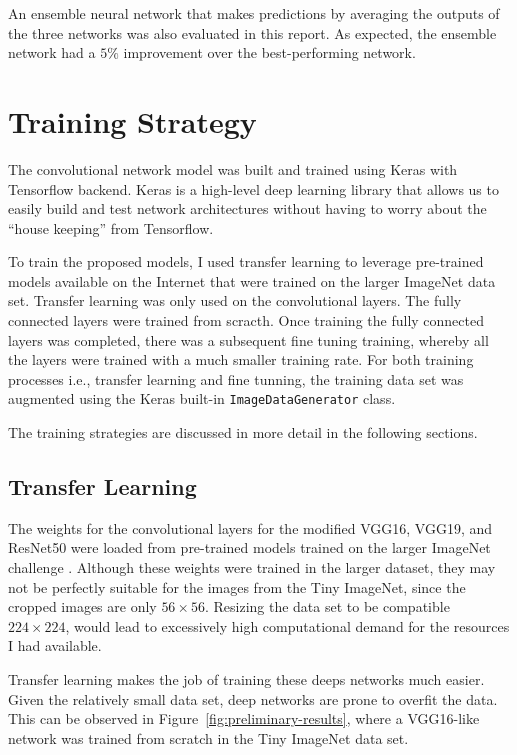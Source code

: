 \documentclass[10pt,twocolumn,letterpaper]{article}
\begin{document}
An ensemble neural network that makes predictions by averaging the outputs of the three networks was also evaluated in this report. As expected, the ensemble network had a $5\%$ improvement over the best-performing network.

\section{Training Strategy} \label{sec:train}

The convolutional network model was built and trained using Keras \cite{keras} with Tensorflow backend. Keras is a high-level deep learning library that allows us to easily build and test network architectures without having to worry about the ``house keeping'' from Tensorflow.

To train the proposed models, I used transfer learning to leverage pre-trained models available on the Internet that were trained on the larger ImageNet data set. Transfer learning was only used on the convolutional layers. The fully connected layers were trained from scracth. Once training the fully connected layers was completed, there was a subsequent fine tuning training, whereby all the layers were trained with a much smaller training rate. For both training processes i.e., transfer learning and fine tunning, the training data set was augmented using the Keras built-in \texttt{ImageDataGenerator} class. 

The training strategies are discussed in more detail in the following sections.

\subsection{Transfer Learning}

The weights for the convolutional layers for the modified VGG16, VGG19, and ResNet50 were loaded from pre-trained models trained on the larger ImageNet challenge \cite{Pretrained-Models}. Although these weights were trained in the larger dataset, they may not be perfectly suitable for the images from the Tiny ImageNet, since the cropped images are only $56 \times 56$. Resizing the data set to be compatible $224 \times 224$, would lead to excessively high computational demand for the resources I had available. 

Transfer learning makes the job of training these deeps networks much easier. Given the relatively small data set, deep networks are prone to overfit the data. This can be observed in Figure~\ref{fig:preliminary-results}, where a VGG16-like network was trained from scratch in the Tiny ImageNet data set.
\end{document}
